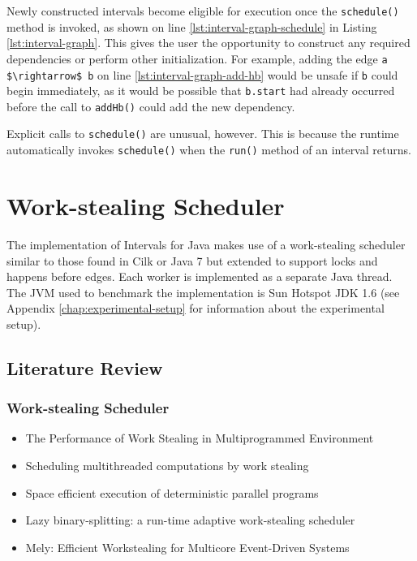 Newly constructed intervals become eligible for execution once the
\lstinline|schedule()| method is invoked, as shown on line
\ref{lst:interval-graph-schedule} in Listing
\ref{lst:interval-graph}. This gives the user the opportunity to
construct any required dependencies or perform other
initialization. For example, adding the edge
\lstinline|a $\rightarrow$ b| on line \ref{lst:interval-graph-add-hb}
would be unsafe if \lstinline|b| could begin immediately, as it would
be possible that \lstinline|b.start| had already occurred before the
call to \lstinline|addHb()| could add the new dependency.

Explicit calls to \lstinline|schedule()| are unusual, however. This is
because the runtime automatically invokes \lstinline|schedule()| when
the \lstinline|run()| method of an interval returns.


\section{Work-stealing Scheduler}
\label{sec:intro-work-stealing-scheduler}


The implementation of Intervals for Java makes use of a work-stealing
scheduler similar to those found in Cilk \cite{Blumofe1995} or Java 7
\cite{Lea} but extended to support locks and happens before
edges. Each worker is implemented as a separate Java thread. The JVM
used to benchmark the implementation is Sun Hotspot JDK 1.6 (see
Appendix \ref{chap:experimental-setup} for information about the
experimental setup).



\subsection{Literature Review}
\label{sec:intro-work-stealing-literature-review}

\subsubsection{Work-stealing Scheduler}

\begin{itemize}
\item The Performance of Work Stealing in Multiprogrammed Environment
  \cite{Blumofe1998a}
\item Scheduling multithreaded computations by work stealing
  \cite{Blumofe1999}
\item Space efficient execution of deterministic parallel programs
  \cite{Simpson1999}
\item Lazy binary-splitting: a run-time adaptive work-stealing
  scheduler \cite{Tzannes2010}
\item Mely: Efficient Workstealing for Multicore Event-Driven Systems
  \cite{Gaud2010}
\end{itemize}

